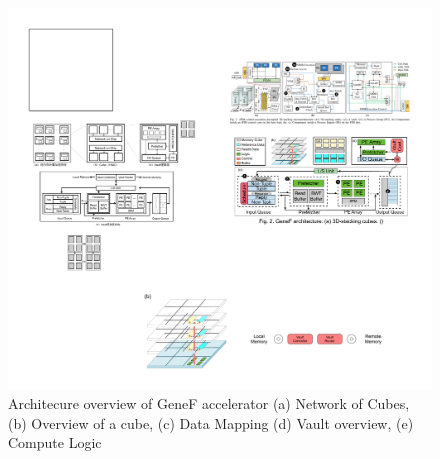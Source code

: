 \documentclass[9pt,conference]{IEEEtran}
\begin{document}
\begin{figure}[t]
\centering
\includegraphics[scale=0.5]{Conference-LaTeX-template_10-17-19/fig/arch.pdf}
\caption{Architecure overview of GeneF accelerator (a) Network of Cubes, (b) Overview of a cube, (c) Data Mapping (d) Vault overview, (e) Compute Logic}
\label{fig:arch_design}
\end{figure}

\end{document}

